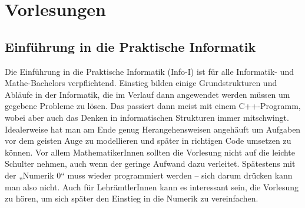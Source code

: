 \section{Vorlesungen}

\subsection{Einführung in die Praktische Informatik}
\label{info1}
Die Einführung in die Praktische Informatik (Info-I) ist für alle Informatik- und Mathe-Bachelors verpflichtend. Einstieg bilden einige Grundstrukturen und Abläufe in der Informatik, die im Verlauf dann angewendet werden müssen um gegebene Probleme zu lösen. Das passiert dann meist mit einem C++-Programm, wobei aber auch das Denken in informatischen Strukturen immer mitschwingt. Idealerweise hat man am Ende genug Herangehensweisen angehäuft um Aufgaben vor dem geisten Auge zu modellieren und später in richtigen Code umsetzen zu können. Vor allem MathematikerInnen sollten die Vorlesung nicht auf die leichte Schulter nehmen, auch wenn der geringe Aufwand dazu verleitet. Spätestens mit der „Numerik 0“ muss wieder programmiert werden -- sich darum drücken kann man also nicht. Auch für LehrämtlerInnen kann es interessant sein, die Vorlesung zu hören, um sich später den Einstieg in die Numerik zu vereinfachen.

